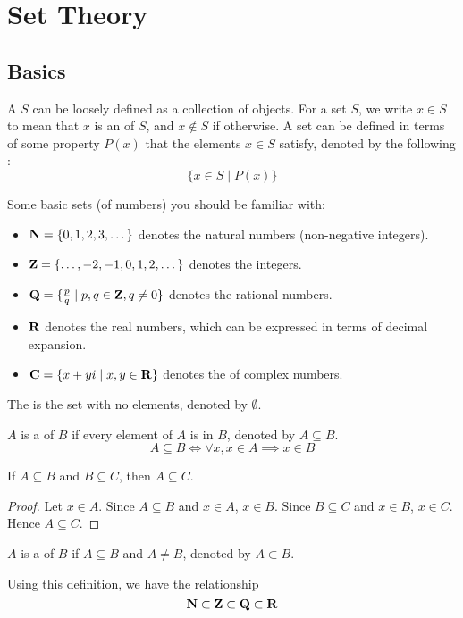 \chapter{Set Theory}\label{chap:set-theory}
\section{Basics}
A  $S$ can be loosely defined as a collection of objects. For a set $S$, we write $x \in S$ to mean that $x$ is an  of $S$, and $x \notin S$ if otherwise. A set can be defined in terms of some property $P(x)$ that the elements $x \in S$ satisfy, denoted by the following :
\[ \{x \in S \mid P(x)\} \]

Some basic sets (of numbers) you should be familiar with:
\begin{itemize}
\item $\mathbf N=\{0,1,2,3,\dots\}$ denotes the natural numbers (non-negative integers).
\item $\mathbf Z=\{\dots,-2,-1,0,1,2,\dots\}$ denotes the integers.
\item $\mathbf Q=\{\frac{p}{q} \mid p,q\in\mathbf Z, q\neq0\}$ denotes the rational numbers.
\item $\mathbf R$ denotes the real numbers, which can be expressed in terms of decimal expansion.
\item $\mathbf C=\{x+yi \mid x,y\in\mathbf R\}$ denotes the of complex numbers.
\end{itemize}

The  is the set with no elements, denoted by $\emptyset$.

$A$ is a  of $B$ if every element of $A$ is in $B$, denoted by $A \subseteq B$.
\[ A \subseteq B \iff \forall x, x\in A \implies x\in B \]

\begin{proposition}
If $A \subseteq B$ and $B \subseteq C$, then $A \subseteq C$.
\end{proposition}

\begin{proof}
Let $x\in A$. 
Since $A \subseteq B$ and $x\in A$, $x\in B$. 
Since $B \subseteq C$ and $x\in B$, $x\in C$. 
Hence $A \subseteq C$.
\end{proof}

$A$ is a  of $B$ if $A \subseteq B$ and $A \neq B$, denoted by $A \subset B$.

Using this definition, we have the relationship 
\[ \mathbf N \subset \mathbf Z \subset \mathbf Q \subset \mathbf R \]

